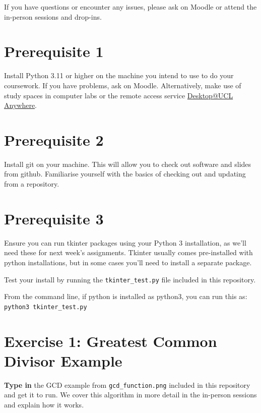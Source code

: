 \documentclass{article}
\begin{document}
If you have questions or encounter any issues, please ask on Moodle or attend the in-person sessions and drop-ins.

\section*{Prerequisite 1}

Install Python 3.11 or higher on the machine you intend to use to do your
coursework.  If you have problems, ask on Moodle. Alternatively, make use of study spaces in computer labs or the remote access service \href{https://www.ucl.ac.uk/isd/services/computers/remote-access/desktopucl-anywhere}{Desktop@UCL Anywhere}.

\section*{Prerequisite 2}

Install git on your machine.  This will allow you to check out
software and slides from github.  Familiarise yourself with the basics
of checking out and updating from a repository.

\section*{Prerequisite 3}

Ensure you can run tkinter packages using your Python 3 installation,
as we'll need these for next week's assignments.  Tkinter usually
comes pre-installed with python installations, but in some cases you'll need to
install a separate package.

\vspace{0.1in}\noindent Test your install by running the \texttt{tkinter\_test.py} file included in this repository.

\vspace{0.1in}\noindent From the command line, if python is installed as python3, you can run this as:\\
\texttt{python3 tkinter\_test.py}

\section*{Exercise 1: Greatest Common Divisor Example}

\textbf{Type in} the GCD example from \texttt{gcd\_function.png} included in this repository and get it to run.  We cover this algorithm in more
detail in the in-person sessions and explain how it works.
\end{document}
